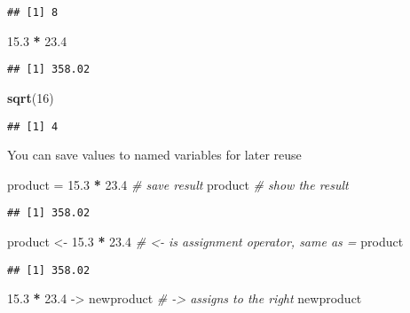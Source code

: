 \documentclass[]{book}
\newenvironment{Shaded}{\begin{snugshade}}{\end{snugshade}}
\newcommand{\CommentTok}[1]{\textcolor[rgb]{0.56,0.35,0.01}{\textit{#1}}}
\newcommand{\DecValTok}[1]{\textcolor[rgb]{0.00,0.00,0.81}{#1}}
\newcommand{\FloatTok}[1]{\textcolor[rgb]{0.00,0.00,0.81}{#1}}
\newcommand{\KeywordTok}[1]{\textcolor[rgb]{0.13,0.29,0.53}{\textbf{#1}}}
\newcommand{\NormalTok}[1]{#1}
\newcommand{\OperatorTok}[1]{\textcolor[rgb]{0.81,0.36,0.00}{\textbf{#1}}}
\newcommand{\StringTok}[1]{\textcolor[rgb]{0.31,0.60,0.02}{#1}}
\begin{document}
\begin{verbatim}
## [1] 8
\end{verbatim}

\begin{Shaded}
\begin{Highlighting}[]
\FloatTok{15.3} \OperatorTok{*}\StringTok{ }\FloatTok{23.4}
\end{Highlighting}
\end{Shaded}

\begin{verbatim}
## [1] 358.02
\end{verbatim}

\begin{Shaded}
\begin{Highlighting}[]
\KeywordTok{sqrt}\NormalTok{(}\DecValTok{16}\NormalTok{)}
\end{Highlighting}
\end{Shaded}

\begin{verbatim}
## [1] 4
\end{verbatim}

You can save values to named variables for later reuse

\begin{Shaded}
\begin{Highlighting}[]
\NormalTok{product =}\StringTok{ }\FloatTok{15.3} \OperatorTok{*}\StringTok{ }\FloatTok{23.4}       \CommentTok{# save result}
\NormalTok{product                     }\CommentTok{# show the result}
\end{Highlighting}
\end{Shaded}

\begin{verbatim}
## [1] 358.02
\end{verbatim}

\begin{Shaded}
\begin{Highlighting}[]
\NormalTok{product <-}\StringTok{ }\FloatTok{15.3} \OperatorTok{*}\StringTok{ }\FloatTok{23.4}      \CommentTok{# <- is assignment operator, same as =}
\NormalTok{product                     }
\end{Highlighting}
\end{Shaded}

\begin{verbatim}
## [1] 358.02
\end{verbatim}

\begin{Shaded}
\begin{Highlighting}[]
\FloatTok{15.3} \OperatorTok{*}\StringTok{ }\FloatTok{23.4}\NormalTok{ ->}\StringTok{ }\NormalTok{newproduct   }\CommentTok{# -> assigns to the right}
\NormalTok{newproduct}
\end{Highlighting}
\end{Shaded}
\end{document}

